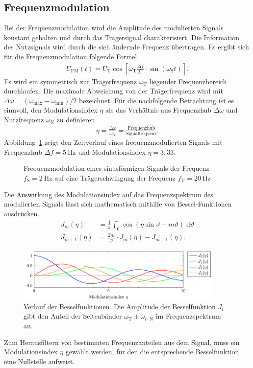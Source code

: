 \documentclass[a4paper,twoside,final]{article}
\begin{document}
\subsection{Frequenzmodulation}
Bei der Frequenzmodulation wird die Amplitude des modulierten Signals konstant gehalten und durch das Trägersignal charakterisiert. Die Information des Nutzsignals wird durch die sich ändernde Frequenz übertragen. Es ergibt sich für die Frequenzmodulation folgende Formel
\begin{align}
  U_\text{FM}(t) = U_\text{T} \cos\left[\omega_\text{T} \frac{\Delta f}{f_\text{S}}\cdot \sin(\omega_\text{S}t)\right].
\end{align}
Es wird ein symmetrisch zur Trägerfrequenz $\omega_\text{T}$ liegender Frequenzbereich durchlaufen. Die maximale Abweichung von der Trägerfrequenz wird mit $\Delta \omega = (\omega_\text{max}-\omega_\text{min})/2$ bezeichnet. Für die nachfolgende Betrachtung ist es sinnvoll, den Modulationsindex $\eta$ als das Verhältnis aus Frequenzhub $\Delta \omega$ und Nutzfrequenz $\omega_\text{N}$ zu definieren
\begin{align}
  \eta = \frac{\Delta \omega}{\omega_\text{N}} = \frac{\text{Frequenzhub}}{\text{Signalfrequenz}}.
\end{align}
Abbildung~\ref{fig:FM} zeigt den Zeitverlauf eines frequenzmodulierten Signals mit Frequenzhub $\Delta f = \SI{5}{\hertz}$ und Modulationsindex $\eta = 3,33$.
\begin{figure}[htp]
    \centering
        
    \caption{Frequenzmodulation eines sinusförmigen Signals der Frequenz $f_\text{S} = \SI{2}{\hertz}$ auf eine Trägerschwingung der Frequenz $f_\text{T} = \SI{20}{\hertz}$}
    \label{fig:FM}
\end{figure}
\FloatBarrier
\noindent
Die Auswirkung des Modulationsindex auf das Frequenzspektrum des modulierten Signals lässt sich mathematisch mithilfe von Bessel-Funktionen ausdrücken.
\begin{align}
    J_m(\eta) &= \frac{1}{\pi}\int_0^\pi \cos(\eta\sin \vartheta - m\vartheta)\; \text{d}\vartheta\\
    J_{m+1} (\eta) &= \frac{2m}{\eta} \cdot J_m(\eta) - J_{m-1}(\eta).
\end{align}
\begin{figure}[htp]
    \centering
    \includegraphics[width=0.9\textwidth]{Schaltungen/Besselfunktion.pdf}
    \caption{Verlauf der Besselfunktionen. Die Amplitude der Besselfunktion $J_i$ gibt den Anteil der Seitenbänder $\omega_\text{T}\pm\omega_{i\cdot\text{N}}$ im Frequenzspektrum an.}
    \label{fig:Besselfunktionen}
\end{figure}
Zum Herausfiltern von bestimmten Frequenzanteilen aus dem Signal, muss ein Modulationsindex $\eta$ gewählt werden, für den die entsprechende Besselfunktion eine Nullstelle aufweist.
\end{document}
